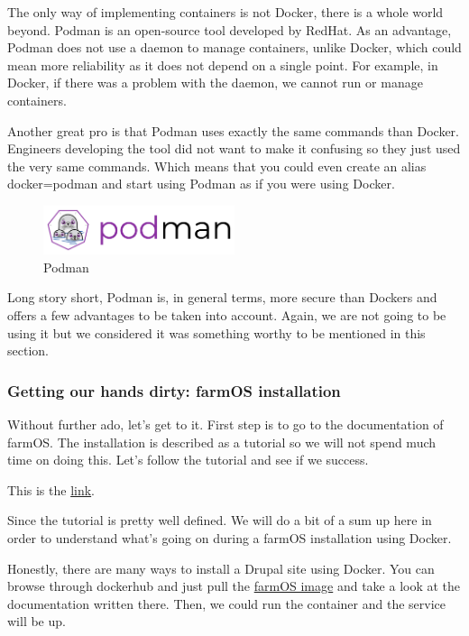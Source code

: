 The only way of implementing containers is not Docker, there is a whole world beyond. Podman is an open-source tool developed by RedHat. As an advantage, Podman does not use a daemon to manage containers, unlike Docker, which could mean more reliability as it does not depend on a single point. For example, in Docker, if there was a problem with the daemon, we cannot run or manage containers.

Another great pro is that Podman uses exactly the same commands than Docker. Engineers developing the tool did not want to make it confusing so they just used the very same commands. Which means that you could even create an alias docker=podman and start using Podman as if you were using Docker. 

\begin{figure}[H]
    \centering
    \includegraphics[width=0.5\textwidth]{fig/podman_logo.png}
        \caption{Podman}
    \label{fig:podman-logo}
\end{figure}


Long story short, Podman is, in general terms, more secure than Dockers and offers a few advantages to be taken into account. Again, we are not going to be using it but we considered it was something worthy to be mentioned in this section.

\subsubsection{Getting our hands dirty: farmOS installation}
Without further ado, let's get to it. First step is to go to the documentation of farmOS. The installation is described as a tutorial so we will not spend much time on doing this. Let's follow the tutorial and see if we success. 

This is the \href{https://farmos.org/hosting/docker/}{link}.

Since the tutorial is pretty well defined. We will do a bit of a sum up here in order to understand what's going on during a farmOS installation using Docker.

Honestly, there are many ways to install a Drupal site using Docker. You can browse through dockerhub and just pull the \href{https://hub.docker.com/r/farmos/farmos}{farmOS image} and take a look at the documentation written there. Then, we could run the container and the service will be up.

